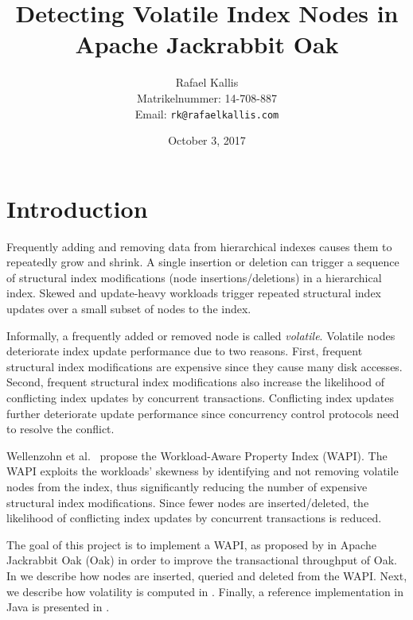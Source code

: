 \documentclass[abstracton,12pt]{scrartcl}
\title{Detecting Volatile Index Nodes in Apache Jackrabbit Oak}
\author{
    Rafael Kallis\\[-5pt]
    \scriptsize Matrikelnummer: 14-708-887\\[-5pt]
    \scriptsize Email: \texttt{rk@rafaelkallis.com}
}
\date{\vspace*{2cm}October 3, 2017}
\theoremstyle{definition}
\begin{document}
\maketitle





\newpage
\section{Introduction}

Frequently adding and removing data from hierarchical indexes causes them to repeatedly grow and shrink.
A single insertion or deletion can trigger a sequence of structural index modifications (node insertions/deletions) in a hierarchical index.
Skewed and update-heavy workloads trigger repeated structural index updates over a small subset of nodes to the index.

Informally, a frequently added or removed node is called \textit{volatile}.
Volatile nodes deteriorate index update performance due to two reasons.
First, frequent structural index modifications are expensive since they cause many disk accesses.
Second, frequent structural index modifications also increase the likelihood of conflicting index updates by concurrent transactions.
Conflicting index updates further deteriorate update performance since concurrency control protocols need to resolve the conflict.

Wellenzohn et al.~\cite{KW17} propose the Workload-Aware Property Index (WAPI). 
The WAPI exploits the workloads' skewness by identifying and not removing volatile nodes from the index, 
thus significantly reducing the number of expensive structural index modifications.
Since fewer nodes are inserted/deleted, the likelihood of conflicting index updates by concurrent transactions is reduced.

The goal of this project is to implement a WAPI, as proposed by \cite{KW17} in Apache Jackrabbit Oak (Oak) in order to improve the transactional throughput of Oak.
In  we describe how nodes are inserted, queried and deleted from the WAPI.
Next, we describe how volatility is computed in .
Finally, a reference implementation in Java is presented in .
\end{document}
